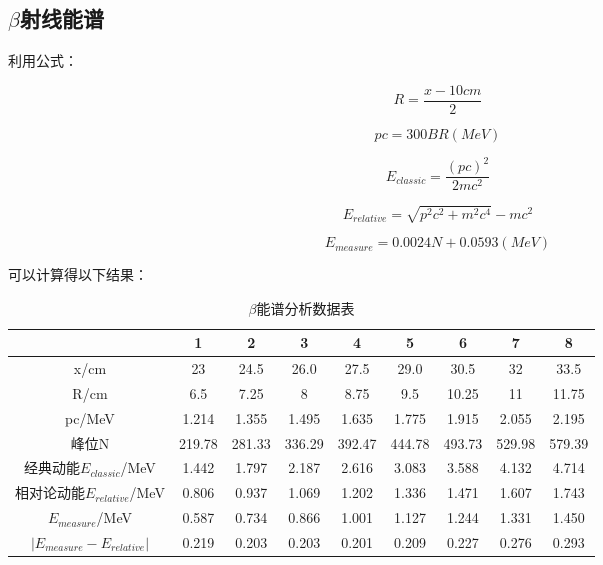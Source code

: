 \documentclass[a4paper,UTF8]{ctexart}
\begin{document}
\subsection{$\beta$射线能谱}

利用公式：

\begin{equation}
    R = \frac{x-10cm}{2}
\end{equation}

\begin{equation}
    pc = 300BR (MeV)
\end{equation}

\begin{equation}
    E_{classic} = \frac{(pc)^2}{2mc^2}
\end{equation}

\begin{equation}
    E_{relative} = \sqrt{p^2c^2 + m^{2}c^4}-mc^2
\end{equation}

\begin{equation}
    E_{measure} = 0.0024 N + 0.0593 (MeV)
\end{equation}

可以计算得以下结果：

\begin{table}[H]
    \centering
    \begin{tabular}{|c|c|c|c|c|c|c|c|c|}
    \hline
        ~ & 1 & 2 & 3 & 4 & 5 & 6 & 7 & 8 \\ \hline
        x/cm & 23 & 24.5 & 26.0 & 27.5 & 29.0 & 30.5 & 32 & 33.5 \\ \hline
        R/cm & 6.5 & 7.25 & 8 & 8.75 & 9.5 & 10.25 & 11 & 11.75 \\ \hline
        pc/MeV & 1.214 & 1.355 & 1.495 & 1.635 & 1.775 & 1.915 & 2.055 & 2.195 \\ \hline
        峰位N & 219.78 & 281.33 & 336.29 & 392.47 & 444.78 & 493.73 & 529.98 & 579.39 \\ \hline
        经典动能$E_{classic}$/MeV & 1.442 & 1.797 & 2.187 & 2.616 & 3.083 & 3.588 & 4.132 & 4.714 \\ \hline
        相对论动能$E_{relative}$/MeV & 0.806 & 0.937 & 1.069 & 1.202 & 1.336 & 1.471 & 1.607 & 1.743 \\ \hline
        $E_{measure}$/MeV & 0.587 & 0.734 & 0.866 & 1.001 & 1.127 & 1.244 & 1.331 & 1.450 \\ \hline
        $\left\lvert E_{measure}-E_{relative}\right\rvert $ & 0.219 & 0.203 & 0.203 &0.201 & 0.209 &0.227 & 0.276 & 0.293 \\ \hline    \end{tabular}
    \caption{$\beta$能谱分析数据表}
\end{table}
\end{document}
